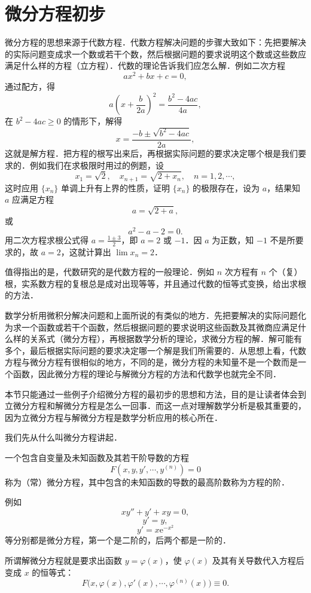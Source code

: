 \section{微分方程初步}\label{sec:8-3}

微分方程的思想来源于代数方程．代数方程解决问题的步骤大致如下：先把要解决的实际问题变成求一个数或若干个数，然后根据问题的要求说明这个数或这些数应满足什么样的方程（立方程）．代数的理论告诉我们应怎么解．例如二次方程
\[
ax^2 + bx + c = 0,
\]
通过配方，得
\[
a\left(x + \frac{b}{2a}\right)^2 = \frac{b^2 - 4ac}{4a},
\]
在 $b^2 - 4ac \geqslant 0$ 的情形下，解得
\[
x = \frac{-b \pm \sqrt{b^2 - 4ac}}{2a},
\]
这就是解方程．把方程的根写出来后，再根据实际问题的要求决定哪个根是我们要求的．例如我们在求极限时用过的例题，设
\[
x_1 = \sqrt{2}, \quad x_{n+1} = \sqrt{2 + x_n}, \quad n = 1, 2, \cdots,
\]
这时应用 $\{x_n\}$ 单调上升有上界的性质，证明 $\{x_n\}$ 的极限存在，设为 $a$，结果知 $a$ 应满足方程
\[
a = \sqrt{2 + a},
\]
或
\[
a^2 - a - 2 = 0.
\]
用二次方程求根公式得 $a = \frac{1 \pm 3}{2}$，即 $a = 2$ 或 $-1$．因 $a$ 为正数，知 $-1$ 不是所要求的，故 $a = 2$，这就计算出 $\lim x_n = 2$．

值得指出的是，代数研究的是代数方程的一般理论．例如 $n$ 次方程有 $n$ 个（复）根，实系数方程的复根总是成对出现等等，并且通过代数的恒等式变换，给出求根的方法．

数学分析用微积分解决问题和上面所说的有类似的地方．先把要解决的实际问题化为求一个函数或若干个函数，然后根据问题的要求说明这些函数及其微商应满足什么样的关系式（微分方程），再根据数学分析的理论，求微分方程的解．解可能有多个，最后根据实际问题的要求决定哪一个解是我们所需要的．从思想上看，代数方程与微分方程有很相似的地方，不同的是，微分方程的未知量不是一个数而是一个函数，因此微分方程的理论与解微分方程的方法和代数学也就完全不同．

本节只能通过一些例子介绍微分方程的最初步的思想和方法，目的是让读者体会到立微分方程和解微分方程是怎么一回事．而这一点对理解数学分析是极其重要的，因为立微分方程与解微分方程是数学分析应用的核心所在．

我们先从什么叫微分方程讲起．

一个包含自变量及未知函数及其若干阶导数的方程
\[
F(x, y, y', \cdots, y^{(n)}) = 0
\]
称为（常）微分方程，其中包含的未知函数的导数的最高阶数称为方程的阶．

例如
\[
xy'' + y' + xy = 0,
\]
\[
y' = y,
\]
\[
y' = x\mathrm{e}^{-x^2}
\]
等分别都是微分方程，第一个是二阶的，后两个都是一阶的．

所谓解微分方程就是要求出函数 $y = \varphi(x)$，使 $\varphi(x)$ 及其有关导数代入方程后变成 $x$ 的恒等式：
\[
F\big(x, \varphi(x), \varphi'(x), \cdots, \varphi^{(n)}(x)\big) \equiv 0.
\]

